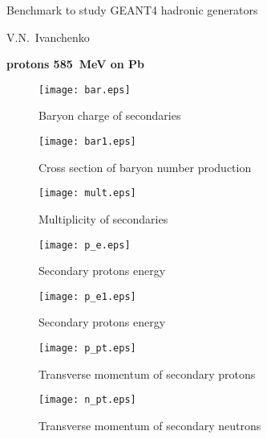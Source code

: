 \documentclass[12pt]{article}
\begin{document}
\pagestyle{empty}

\begin{center}
{\large Benchmark to study GEANT4 hadronic generators} 

\vspace*{5mm}
V.N.~Ivanchenko

\vspace*{5mm}


\vspace*{5mm}

{\bf protons 585~MeV on Pb} 

\vspace*{5mm}


\end{center}


\begin{figure}[htbp]
\caption{Baryon charge of secondaries}
\label{fig1}  
\centerline{\texttt{[image: bar.eps]}}
\end{figure}

\begin{figure}[htbp]
\caption{Cross section of baryon number production}
\label{fig1b}  
\centerline{\texttt{[image: bar1.eps]}}
\end{figure}


\begin{figure}[htbp]
\caption{Multiplicity of secondaries}
\label{fig1a}  
\centerline{\texttt{[image: mult.eps]}}
\end{figure}
\begin{figure}[htbp]
\caption{Secondary protons energy}
\label{fig2} 
\centerline{\texttt{[image: p\_e.eps]}}
\end{figure}
\begin{figure}[htbp]
\caption{Secondary protons energy}
\label{fig2a} 
\centerline{\texttt{[image: p\_e1.eps]}}
\end{figure}

\newpage

\begin{figure}[htbp]
\caption{Transverse momentum of secondary protons} 
\label{fig3}
\centerline{\texttt{[image: p\_pt.eps]}}
\end{figure}

\newpage

\begin{figure}[htbp]
\caption{Transverse momentum of secondary neutrons} 
\label{fig4}
\centerline{\texttt{[image: n\_pt.eps]}}
\end{figure}
\end{document}
